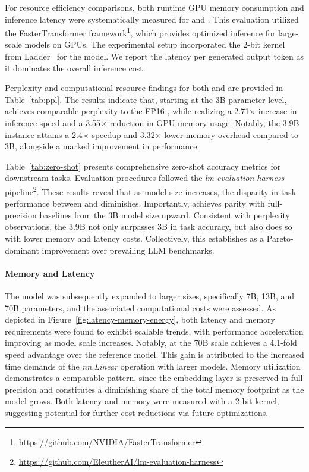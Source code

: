 For resource efficiency comparisons, both runtime GPU memory consumption and inference latency were systematically measured for  and . This evaluation utilized the FasterTransformer framework\footnote{\url{https://github.com/NVIDIA/FasterTransformer}}, which provides optimized inference for large-scale models on GPUs. The experimental setup incorporated the 2-bit kernel from Ladder~\cite{ladder} for the  model. We report the latency per generated output token as it dominates the overall inference cost.

Perplexity and computational resource findings for both  and  are provided in Table~\ref{tab:ppl}. The results indicate that, starting at the 3B parameter level,  achieves comparable perplexity to the FP16 , while realizing a 2.71$\times$ increase in inference speed and a 3.55$\times$ reduction in GPU memory usage. Notably, the 3.9B  instance attains a 2.4$\times$ speedup and 3.32$\times$ lower memory overhead compared to  3B, alongside a marked improvement in performance.

Table~\ref{tab:zero-shot} presents comprehensive zero-shot accuracy metrics for downstream tasks. Evaluation procedures followed the \emph{lm-evaluation-harness} pipeline\footnote{\url{https://github.com/EleutherAI/lm-evaluation-harness}}. These results reveal that as model size increases, the disparity in task performance between  and  diminishes. Importantly,  achieves parity with full-precision baselines from the 3B model size upward. Consistent with perplexity observations, the 3.9B  not only surpasses  3B in task accuracy, but also does so with lower memory and latency costs. Collectively, this establishes  as a Pareto-dominant improvement over prevailing LLM benchmarks.

\paragraph{Memory and Latency}

The model was subsequently expanded to larger sizes, specifically 7B, 13B, and 70B parameters, and the associated computational costs were assessed. As depicted in Figure~\ref{fig:latency-memory-energy}, both latency and memory requirements were found to exhibit scalable trends, with performance acceleration improving as model scale increases. Notably,  at the 70B scale achieves a 4.1-fold speed advantage over the  reference model. This gain is attributed to the increased time demands of the \emph{nn.Linear} operation with larger models. Memory utilization demonstrates a comparable pattern, since the embedding layer is preserved in full precision and constitutes a diminishing share of the total memory footprint as the model grows. Both latency and memory were measured with a 2-bit kernel, suggesting potential for further cost reductions via future optimizations.

